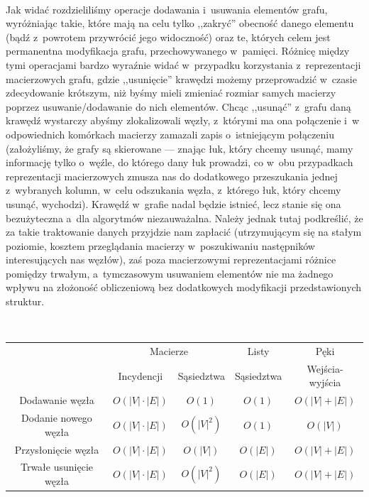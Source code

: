 ~

Jak widać rozdzieliliśmy operacje dodawania i~usuwania elementów grafu, wyróżniając takie, które mają na celu tylko ,,zakryć'' obecność danego elementu (bądź z~powrotem przywrócić jego widoczność) oraz te, których celem jest permanentna modyfikacja grafu, przechowywanego w~pamięci. Różnicę między tymi operacjami bardzo wyraźnie widać w~przypadku korzystania z~reprezentacji macierzowych grafu, gdzie ,,usunięcie'' krawędzi możemy przeprowadzić w~czasie zdecydowanie krótszym, niż byśmy mieli zmieniać rozmiar samych macierzy poprzez usuwanie/dodawanie do nich elementów. Chcąc ,,usunąć'' z~grafu daną krawędź wystarczy abyśmy zlokalizowali węzły, z~którymi ma ona połączenie i~w odpowiednich komórkach macierzy zamazali zapis o~istniejącym połączeniu (założyliśmy, że grafy są skierowane --- znając łuk, który chcemy usunąć, mamy informację tylko o~węźle, do którego dany łuk prowadzi, co w~obu przypadkach reprezentacji macierzowych zmusza nas do dodatkowego przeszukania jednej z~wybranych kolumn, w~celu odszukania węzła, z~którego łuk, który chcemy usunąć, wychodzi). Krawędź w~grafie nadal będzie istnieć, lecz stanie się ona bezużyteczna a~dla algorytmów niezauważalna. Należy jednak tutaj podkreślić, że za takie traktowanie danych przyjdzie nam zapłacić (utrzymującym się na stałym poziomie, kosztem przeglądania macierzy w~poszukiwaniu następników interesujących nas węzłów), zaś poza macierzowymi reprezentacjami różnice pomiędzy trwałym, a~tymczasowym usuwaniem elementów nie ma żadnego wpływu na złożoność obliczeniową bez dodatkowych modyfikacji przedstawionych struktur.

~
\begin{center}
	\begin{tabular}{ccccc}
		\hline
		& \multicolumn{2}{c}{Macierze} & \multicolumn{1}{c}{Listy} & \multicolumn{1}{c}{Pęki} \\
		& Incydencji & Sąsiedztwa & Sąsiedztwa & Wejścia-wyjścia \\
		\hline
		Dodawanie węzła & $ O \left( \left| V \right| \cdot \left| E \right| \right) $ & $ O \left( 1 \right) $ & $O \left( 1 \right) $ & $O \left( \left| V \right| + \left| E \right| \right) $ \\
		Dodanie nowego  węzła & $ O \left( \left| V \right| \cdot \left| E \right| \right) $  & $ O \left( \left| V \right| ^{2} \right)$ & $ O \left( 1 \right)$ & $ O \left( \left| V \right| \right)$ \\
		Przysłonięcie węzła & $ O \left( \left| V \right| \cdot \left| E \right| \right) $  & $ O \left( \left| V \right| \right)$ & $ O \left( \left| E \right| \right)$ & $ O \left( \left| V \right| + \left| E \right| \right)$ \\
		Trwałe usunięcie węzła & $ O \left( \left| V \right| \cdot \left| E \right| \right) $  & $ O \left( \left| V \right| ^{2} \right)$ & $ O \left( \left| E \right| \right)$ & $ O \left( \left| V \right| + \left| E \right| \right)$ \\
	\end{tabular}
\end{center}

